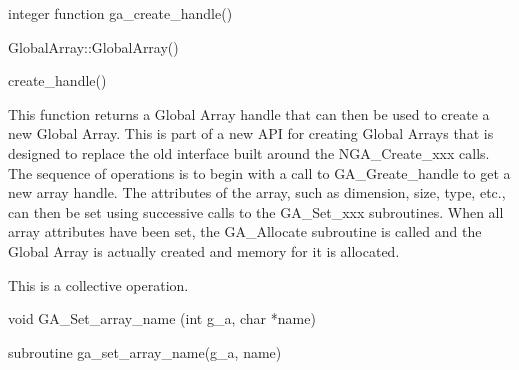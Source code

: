 \documentclass[12pt]{article}
\begin{document}
\begin{fapi}
\begin{fcode}
integer function ga_create_handle()
\end{fcode}
\end{fapi}

\begin{cxxapi}
\begin{cxxcode}
GlobalArray::GlobalArray()
\end{cxxcode}
\end{cxxapi}

\begin{pyapi}
\begin{pycode}
create_handle()
\end{pycode}
\end{pyapi}
\dcoll

\begin{desc}

  This function returns a Global Array handle that can then be used to
  create a new Global Array. This is part of a new API for creating
  Global Arrays that is designed to replace the old interface built
  around the NGA_Create_xxx calls. The sequence of operations is to
  begin with a call to GA_Greate_handle to get a new array handle. The
  attributes of the array, such as dimension, size, type, etc., can
  then be set using successive calls to the GA_Set_xxx subroutines.
  When all array attributes have been set, the GA_Allocate subroutine
  is called and the Global Array is actually created and memory for it
  is allocated.

  This is a collective operation.

\end{desc}



\begin{capi}
\begin{ccode}
void GA_Set_array_name (int g_a, char *name)
\end{ccode}
\begin{funcargs}
\end{funcargs}
\end{capi}

\begin{fapi}
\begin{fcode}
subroutine ga_set_array_name(g_a, name)
\end{fcode}
\begin{funcargs}
\end{funcargs}
\end{fapi}
\end{document}
